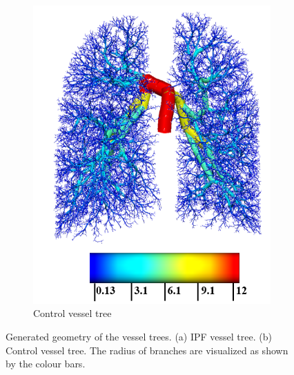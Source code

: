 \begin{figure}[htbp]
\begin{subfigure}{.4\linewidth}
  \includegraphics[width=\linewidth,trim={{.0\wd0} {.0\wd0} {.0\wd0} {.0\wd0}},clip]{ModelBasedAnalysis/Image/IPF405_ArteryRadius_Normal.png}
  \caption{Control vessel tree}
  \label{fig:VesselTreeGeometry-b} 
\end{subfigure}
\caption{Generated geometry of the vessel trees. (a) IPF vessel tree. (b) Control vessel tree. The radius of branches are visualized as shown by the colour bars.} 
\label{fig:VesselTreeGeometry}
\end{figure}

